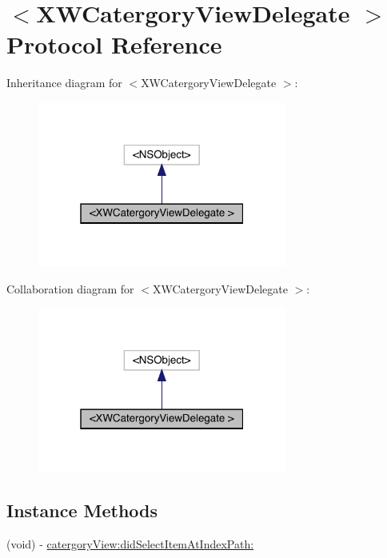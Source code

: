 \hypertarget{protocol_x_w_catergory_view_delegate_01-p}{}\section{$<$X\+W\+Catergory\+View\+Delegate $>$ Protocol Reference}
\label{protocol_x_w_catergory_view_delegate_01-p}


Inheritance diagram for $<$X\+W\+Catergory\+View\+Delegate $>$\+:\nopagebreak
\begin{figure}[H]
\begin{center}
\leavevmode
\includegraphics[width=232pt]{protocol_x_w_catergory_view_delegate_01-p__inherit__graph}
\end{center}
\end{figure}


Collaboration diagram for $<$X\+W\+Catergory\+View\+Delegate $>$\+:\nopagebreak
\begin{figure}[H]
\begin{center}
\leavevmode
\includegraphics[width=232pt]{protocol_x_w_catergory_view_delegate_01-p__coll__graph}
\end{center}
\end{figure}
\subsection*{Instance Methods}
\begin{DoxyCompactItemize}
\item 
(void) -\/ \mbox{\hyperlink{protocol_x_w_catergory_view_delegate_01-p_a51d66b3a7e2330532b7a82aa4aa283dd}{catergory\+View\+:did\+Select\+Item\+At\+Index\+Path\+:}}
\end{DoxyCompactItemize}


